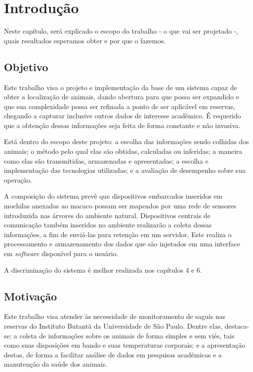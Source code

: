 \chapter{Introdução}
Neste capítulo, será explicado o escopo do trabalho - o que vai ser projetado -, quais resultados esperamos obter e por que o fazemos.

\section{Objetivo}
Este trabalho visa o projeto e implementação da base de um sistema capaz de obter a localização de animais, dando abertura para que possa ser expandido e que sua complexidade possa ser refinada a ponto de ser aplicável em reservas, chegando a capturar inclusive outros dados de interesse acadêmico. É requerido que a obtenção dessas informações seja feita de forma constante e não invasiva.

Está dentro do escopo deste projeto: a escolha das informações sendo colhidas dos animais; o método pelo qual elas são obtidas, calculadas ou inferidas; a maneira como elas são transmitidas, armazenadas e apresentadas; a escolha e implementação das tecnologias utilizadas; e a avaliação de desempenho sobre sua operação.

A composição do sistema prevê que dispositivos embarcados inseridos em mochilas anexadas ao macaco possam ser mapeados por uma rede de sensores introduzida nas árvores do ambiente natural. Dispositivos centrais de comunicação também inseridos no ambiente realizarão a coleta dessas informações, a fim de enviá-las para retenção em um servidor. Este realiza o processamento e armazenamento dos dados que são injetados em uma interface em \emph{software} disponível para o usuário.

A discriminação do sistema é melhor realizada nos capítulos 4 e 6.

\section{Motivação}
Este trabalho visa atender às necessidade de monitoramento de saguis nas reservas do Instituto Butantã da Universidade de São Paulo. Dentre elas, destaca-se: a coleta de informações sobre os animais de forma simples e sem viés, tais como suas disposições em bando e suas temperaturas corporais; e a apresentação destas, de forma a facilitar análise de dados em  pesquisas acadêmicas e a manutenção da saúde dos animais.

